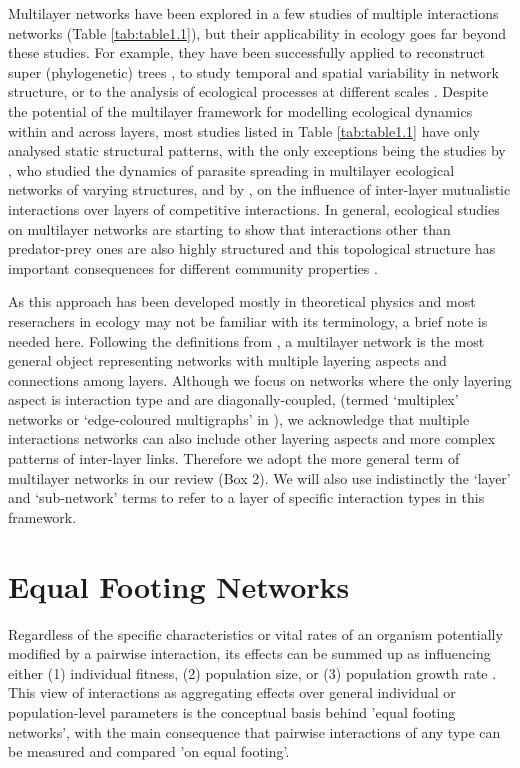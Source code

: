 Multilayer networks have been explored in a few studies of multiple interactions networks (Table \ref{tab:table1.1}), but their applicability in ecology goes far beyond these studies. For example, they have been successfully applied to reconstruct super (phylogenetic) trees \citep{vonHaeseler2012}, to study temporal and spatial variability in network structure, or to the analysis of ecological processes at different scales \citep{Pilosof2017} . Despite the potential of the multilayer framework for modelling ecological dynamics within and across layers, most studies listed in Table \ref{tab:table1.1} have only analysed static structural patterns, with the only exceptions being the studies by \cite{Stella2016}, who studied the dynamics of parasite spreading in multilayer ecological networks of varying structures, and by \cite{Gracia-Lazaro2018}, on the influence of inter-layer mutualistic interactions over layers of competitive interactions. In general, ecological studies on multilayer networks are starting to show that interactions other than predator-prey ones are also highly structured \citep{Melian2009,Kefi2015} and this topological structure has important consequences for different community properties \citep{Pocock2012, Evans2013a, Kefi2016a}.

As this approach has been developed mostly in theoretical physics and most reserachers in ecology may not be familiar with its terminology, a brief note is needed here. Following the definitions from \cite{Kivela2014}, a multilayer network is the most general object representing networks with multiple layering aspects and connections among layers. Although we focus on networks where the only layering aspect is interaction type and are diagonally-coupled, (termed `multiplex' networks or `edge-coloured multigraphs' in \citealt{Kivela2014}), we acknowledge that multiple interactions networks can also include other layering aspects and more complex patterns of inter-layer links. Therefore we adopt the more general term of multilayer networks in our review (Box 2). We will also use indistinctly the `layer' and `sub-network' terms to refer to a layer of specific interaction types in this framework.

\section*{Equal Footing Networks}

Regardless of the specific characteristics or vital rates of an organism potentially modified by a pairwise interaction, its effects can be summed up as influencing either (1) individual fitness, (2) population size, or (3) population growth rate \citep{Abrams1987}. This view of interactions as aggregating effects over general individual or population-level parameters is the conceptual basis behind {}'equal footing networks{}', with the main consequence that pairwise interactions of any type can be measured and compared {}'on equal footing'.


